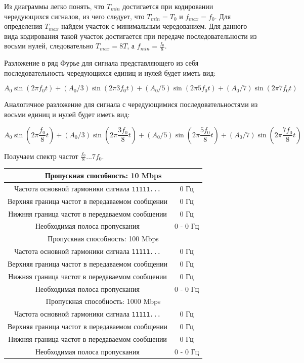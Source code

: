 \documentclass[12pt, a4paper]{article}
\newcommand{\bandwidthEntry}[4]{
  \hline
  \multicolumn{2}{|c|}{Пропускная способность: #1 Mbps} \\
  \hline
  Частота основной гармоники сигнала \texttt{11111...} & #2 Гц \\
  Верхняя граница частот в передаваемом сообщении & #3 Гц \\
  Нижняя граница частот в передаваемом сообщении & #4 Гц \\
  Необходимая полоса пропускания & #3 - #4 Гц \\
}
\begin{document}
Из диаграммы легко понять, что $T_{min}$ достигается при кодировании чередующихся
сигналов, из чего следует, что $T_{min} = T_0$ и $f_{max} = f_0$. Для определения
$T_{max}$ найдем участок с минимальным чередованием. Для данного вида кодирования
такой участок достигается при передаче последовательности из восьми нулей,
следовательно $T_{max} = 8T$, а $f_{min} = \frac{f_0}{8}$.

Разложение в ряд Фурье для сигнала представляющего из себя последовательность
чередующихся единиц и нулей будет иметь вид:

$$A_0 \sin(2 \pi f_0 t) + (A_0 / 3) \sin(2 \pi 3 f_0 t) +
  (A_0 / 5) \sin(2 \pi 5 f_0 t) + (A_0 / 7) \sin(2 \pi 7 f_0 t)$$

Аналогичное разложение для сигнала с чередующимися последовательностями из
восьми единиц и нулей будет иметь вид:

$$A_0 \sin(2 \pi \frac{f_0}{8} t) + (A_0 / 3) \sin(2 \pi \frac{3 f_0}{8} t) +
  (A_0 / 5) \sin(2 \pi \frac{5 f_0}{8} t) + (A_0 / 7) \sin(2 \pi \frac{7 f_0}{8} t)$$

Получаем спектр частот $\frac{f_0}{8}...7 f_0$.

\newpage

\begin{tabular}{| c | c |}
  \bandwidthEntry{10}{0}{0}{0}
  \bandwidthEntry{100}{0}{0}{0}
  \bandwidthEntry{1000}{0}{0}{0}
  \hline
\end{tabular}
\end{document}
